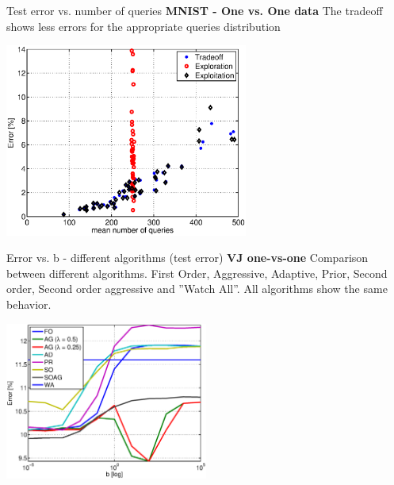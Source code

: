 \documentclass{beamer}
\begin{document}
\begin{frame}{Test error vs. number of queries}
\textbf{MNIST -  One vs. One data} \newline
The tradeoff   shows less errors for the appropriate queries distribution\newline

\begin{centering}
\includegraphics[width=0.6\textwidth]{figs/mnist2b.eps}

\end{centering}

\end{frame}


%
%
%



\begin{frame}{Error vs. b - different algorithms (test error) }
\textbf{VJ one-vs-one} \newline
Comparison between different algorithms. 
First Order, Aggressive, Adaptive, Prior, Second order, Second order aggressive and ''Watch All''.
All algorithms show the same behavior.  \newline

\begin{centering}
\includegraphics[width=0.5\textwidth]{figs/test-v1.eps}

\end{centering}

\end{frame}
\end{document}
